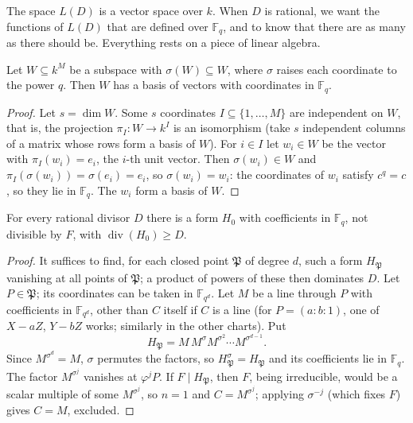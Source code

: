 The space $L(D)$ is a vector space over $k$. When $D$ is rational, we want the functions of $L(D)$ that are defined over $\mathbb F_q$, and to know that there
are as many as there should be. Everything rests on a piece of linear algebra.

\begin{lemma}\label{lem:descentlin}
Let $W\subseteq k^M$ be a subspace with $\sigma(W)\subseteq W$, where $\sigma$ raises each coordinate to the power $q$. Then $W$ has a basis of vectors with
coordinates in $\mathbb F_q$.
\end{lemma}
\begin{proof}
Let $s=\dim W$. Some $s$ coordinates $I\subseteq\{1,\dots,M\}$ are independent on $W$, that is, the projection $\pi_I:W\to k^I$ is an isomorphism (take $s$
independent columns of a matrix whose rows form a basis of $W$). For $i\in I$ let $w_i\in W$ be the vector with $\pi_I(w_i)=e_i$, the $i$-th unit vector.
Then $\sigma(w_i)\in W$ and $\pi_I(\sigma(w_i))=\sigma(e_i)=e_i$, so $\sigma(w_i)=w_i$: the coordinates of $w_i$ satisfy $c^q=c$, so they lie in
$\mathbb F_q$. The $w_i$ form a basis of $W$.
\end{proof}

\begin{lemma}\label{lem:normform}
For every rational divisor $D$ there is a form $H_0$ with coefficients in $\mathbb F_q$, not divisible by $F$, with $\operatorname{div}(H_0)\ge D$.
\end{lemma}
\begin{proof}
It suffices to find, for each closed point $\mathfrak P$ of degree $d$, such a form $H_{\mathfrak P}$ vanishing at all points of $\mathfrak P$; a product of powers of
these then dominates $D$. Let $P\in\mathfrak P$; its coordinates can be taken in $\mathbb F_{q^d}$. Let $M$ be a line through $P$ with coefficients in $\mathbb F_{q^d}$,
other than $C$ itself if $C$ is a line (for $P=(a:b:1)$, one of $X-aZ$, $Y-bZ$ works; similarly in the other charts). Put
\[
H_{\mathfrak P}=M\,M^\sigma M^{\sigma^2}\cdots M^{\sigma^{d-1}}.
\]
Since $M^{\sigma^d}=M$, $\sigma$ permutes the factors, so $H_{\mathfrak P}^\sigma=H_{\mathfrak P}$ and its coefficients lie in $\mathbb F_q$. The factor $M^{\sigma^j}$
vanishes at $\varphi^jP$. If $F\mid H_{\mathfrak P}$, then $F$, being irreducible, would be a scalar multiple of some $M^{\sigma^j}$, so $n=1$ and $C=M^{\sigma^j}$;
applying $\sigma^{-j}$ (which fixes $F$) gives $C=M$, excluded.
\end{proof}

